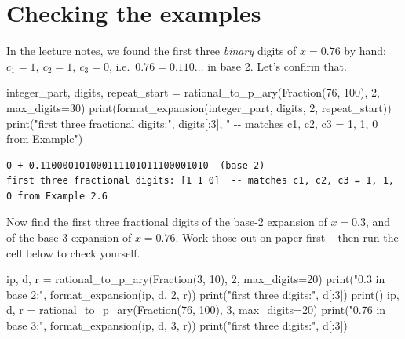 \documentclass[
  letterpaper,
  DIV=11,
  numbers=noendperiod]{scrreprt}
\newenvironment{Shaded}{\begin{snugshade}}{\end{snugshade}}
\newcommand{\BuiltInTok}[1]{\textcolor[rgb]{0.00,0.23,0.31}{#1}}
\newcommand{\DecValTok}[1]{\textcolor[rgb]{0.68,0.00,0.00}{#1}}
\newcommand{\NormalTok}[1]{\textcolor[rgb]{0.00,0.23,0.31}{#1}}
\newcommand{\OperatorTok}[1]{\textcolor[rgb]{0.37,0.37,0.37}{#1}}
\newcommand{\StringTok}[1]{\textcolor[rgb]{0.13,0.47,0.30}{#1}}
\theoremstyle{plain}
\theoremstyle{plain}
\theoremstyle{definition}
\theoremstyle{definition}
\theoremstyle{definition}
\theoremstyle{plain}
\theoremstyle{plain}
\theoremstyle{remark}
\begin{document}
\section{Checking the examples}\label{checking-the-examples}

In the lecture notes, we found the first three \emph{binary} digits of
\(x = 0.76\) by hand: \(c_1=1,\ c_2=1,\ c_3=0\),
i.e.~\(0.76 = 0.110\ldots\) in base 2. Let's confirm that.

\begin{Shaded}
\begin{Highlighting}[]
\NormalTok{integer\_part, digits, repeat\_start }\OperatorTok{=}\NormalTok{ rational\_to\_p\_ary(Fraction(}\DecValTok{76}\NormalTok{, }\DecValTok{100}\NormalTok{), }\DecValTok{2}\NormalTok{, max\_digits}\OperatorTok{=}\DecValTok{30}\NormalTok{)}
\BuiltInTok{print}\NormalTok{(format\_expansion(integer\_part, digits, }\DecValTok{2}\NormalTok{, repeat\_start))}
\BuiltInTok{print}\NormalTok{(}\StringTok{"first three fractional digits:"}\NormalTok{, digits[:}\DecValTok{3}\NormalTok{], }\StringTok{" {-}{-} matches c1, c2, c3 = 1, 1, 0 from Example"}\NormalTok{)}
\end{Highlighting}
\end{Shaded}

\begin{verbatim}
0 + 0.110000101000111101011100001010  (base 2)
first three fractional digits: [1 1 0]  -- matches c1, c2, c3 = 1, 1, 0 from Example 2.6
\end{verbatim}

Now find the first three fractional digits of the base-2 expansion of
\(x = 0.3\), and of the base-3 expansion of \(x = 0.76\). Work those out
on paper first -- then run the cell below to check yourself.

\begin{Shaded}
\begin{Highlighting}[]
\NormalTok{ip, d, r }\OperatorTok{=}\NormalTok{ rational\_to\_p\_ary(Fraction(}\DecValTok{3}\NormalTok{, }\DecValTok{10}\NormalTok{), }\DecValTok{2}\NormalTok{, max\_digits}\OperatorTok{=}\DecValTok{20}\NormalTok{)}
\BuiltInTok{print}\NormalTok{(}\StringTok{"0.3 in base 2:"}\NormalTok{, format\_expansion(ip, d, }\DecValTok{2}\NormalTok{, r))}
\BuiltInTok{print}\NormalTok{(}\StringTok{"first three digits:"}\NormalTok{, d[:}\DecValTok{3}\NormalTok{])}
\BuiltInTok{print}\NormalTok{()}
\NormalTok{ip, d, r }\OperatorTok{=}\NormalTok{ rational\_to\_p\_ary(Fraction(}\DecValTok{76}\NormalTok{, }\DecValTok{100}\NormalTok{), }\DecValTok{3}\NormalTok{, max\_digits}\OperatorTok{=}\DecValTok{20}\NormalTok{)}
\BuiltInTok{print}\NormalTok{(}\StringTok{"0.76 in base 3:"}\NormalTok{, format\_expansion(ip, d, }\DecValTok{3}\NormalTok{, r))}
\BuiltInTok{print}\NormalTok{(}\StringTok{"first three digits:"}\NormalTok{, d[:}\DecValTok{3}\NormalTok{])}
\end{Highlighting}
\end{Shaded}
\end{document}
